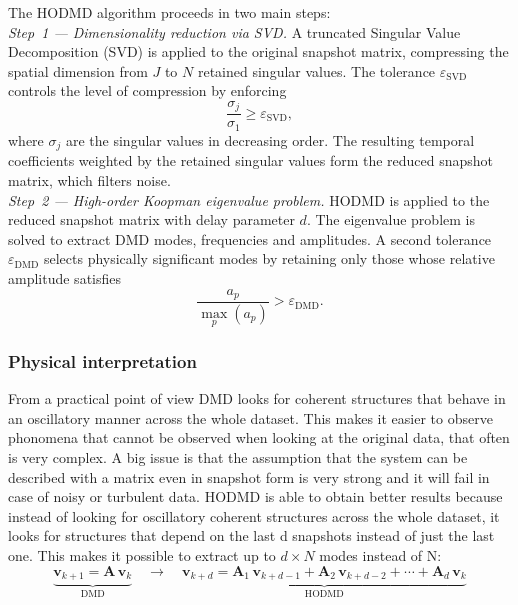 The HODMD algorithm proceeds in two main steps:\\
\emph{Step~1 — Dimensionality reduction via SVD.}\label{subsec:svd_dmd}
A truncated Singular Value Decomposition (SVD) is applied to the original snapshot matrix, compressing the spatial dimension from $J$ to $N$ retained singular values.
The tolerance $\varepsilon_{\mathrm{SVD}}$ controls the level of compression by enforcing
\begin{equation}
    \frac{\sigma_j}{\sigma_1} \geq \varepsilon_{\mathrm{SVD}},
    \label{eq:svd_trunc}
\end{equation}
where $\sigma_j$ are the singular values in decreasing order.
The resulting temporal coefficients weighted by the retained singular values form the reduced snapshot matrix, which filters noise.\\
\emph{Step~2 — High-order Koopman eigenvalue problem.}
HODMD is applied to the reduced snapshot matrix with delay parameter $d$.
The eigenvalue problem is solved to extract DMD modes, frequencies and amplitudes.
A second tolerance $\varepsilon_{\mathrm{DMD}}$ selects physically significant modes by retaining only those whose relative amplitude satisfies
\begin{equation}
    \frac{a_p}{\max_p(a_p)} > \varepsilon_{\mathrm{DMD}}.
    \label{eq:dmd_trunc}
\end{equation} 

\subsubsection{Physical interpretation}

From a practical point of view DMD looks for coherent structures that behave in an oscillatory manner across the whole dataset. This makes it easier to observe phonomena that cannot be observed when looking at the original data, that often is very complex. A big issue is that the assumption that the system can be described with a matrix even in snapshot form is very strong and it will fail in case of noisy or turbulent data. 
HODMD is able to obtain better results because instead of looking for oscillatory coherent structures across the whole dataset, it looks for structures that depend on the last d snapshots instead of just the last one. This makes it possible to extract up to $d \times N$  modes instead of N:
\begin{equation*}
\underbrace{\mathbf{v}_{k+1} = \mathbf{A}\,\mathbf{v}_k}_{\text{DMD}}
\quad \longrightarrow \quad
\underbrace{\mathbf{v}_{k+d} = \mathbf{A}_1\,\mathbf{v}_{k+d-1} + \mathbf{A}_2\,\mathbf{v}_{k+d-2} + \cdots + \mathbf{A}_d\,\mathbf{v}_k}_{\text{HODMD}}
\end{equation*}




